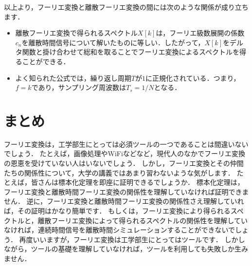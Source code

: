以上より，フーリエ変換と離散フーリエ変換の間には次のような関係が成り立ちます．
\begin{itemize}
\item 離散フーリエ変換で得られるスペクトル$X[k]$は，フーリエ級数展開の係数$c_n$を離散時間信号について解いたものに等しい．したがって，$X[k]$をデルタ関数と掛け合わせて総和を取ることでフーリエ変換によるスペクトルを得ることができる．
\item よく知られた公式では，繰り返し周期$T$が$1$に正規化されている．つまり，$f=k$であり，サンプリング周波数は$T_s = 1/N$となる．
\end{itemize}


\section{まとめ}

フーリエ変換は，工学部生にとっては必須ツールの一つであることは間違いないでしょう．
たとえば，画像処理やWiFiなどなど，現代人のなかでフーリエ変換の恩恵を受けていない人はいないでしょう．
しかし，フーリエ変換とその仲間たちの関係性について，大学の講義ではあまり習わないような気がします．
たとえば，皆さんは標本化定理を即座に証明できるでしょうか．
標本化定理は，フーリエ変換と離散時間フーリエ変換の関係性を理解していなければ証明できません．
逆に，フーリエ変換と離散時間フーリエ変換の関係性さえ理解していれば，その証明はかなり簡単です．
もしくは，フーリエ変換により得られるスペクトルと，離散フーリエ変換によって得られるスペクトルの関係性を理解していなければ，連続時間信号を離散時間シミュレーションすることができないでしょう．
再度いいますが，フーリエ変換は工学部生にとってはツールです．
しかしながら，ツールの基礎を理解していなければ，ツールを利用しても失敗しか生みません．
